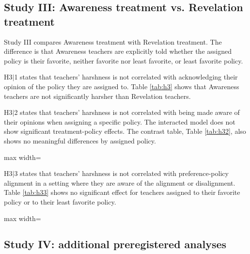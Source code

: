\documentclass[12pt,a4paper]{article}
\newcommand{\tabpath}{../3. Output/tables/}
\begin{document}
\subsection{Study III: Awareness treatment vs. Revelation treatment}

Study III compares Awareness treatment with Revelation treatment. The difference is that Awareness teachers are explicitly told whether the assigned policy is their favorite, neither favorite nor least favorite, or least favorite policy.

H3\(|\)1 states that teachers' harshness is not correlated with acknowledging their opinion of the policy they are assigned to. Table \ref{tab:h3} shows that Awareness teachers are not significantly harsher than Revelation teachers.

H3\(|\)2 states that teachers' harshness is not correlated with being made aware of their opinions when assigning a specific policy. The interacted model does not show significant treatment-policy effects. The contrast table, Table \ref{tab:h32}, also shows no meaningful differences by assigned policy.

\begin{table}[H]
	\centering
	\caption{Study III: H3\(|\)1 and H3\(|\)2}
	\label{tab:h3}
	\begin{adjustbox}{max width=\textwidth}
		
	\end{adjustbox}
\end{table}

\begin{table}[H]
	\centering
	\caption{Study III: H3\(|\)2 contrasts by assigned policy}
	\label{tab:h32}
	
\end{table}

H3\(|\)3 states that teachers' harshness is not correlated with preference-policy alignment in a setting where they are aware of the alignment or disalignment. Table \ref{tab:h33} shows no significant effect for teachers assigned to their favorite policy or to their least favorite policy.

\begin{table}[H]
	\centering
	\caption{Study III: H3\(|\)3}
	\label{tab:h33}
	\begin{adjustbox}{max width=\textwidth}
		
	\end{adjustbox}
\end{table}

\subsection{Study IV: additional preregistered analyses}
\end{document}
